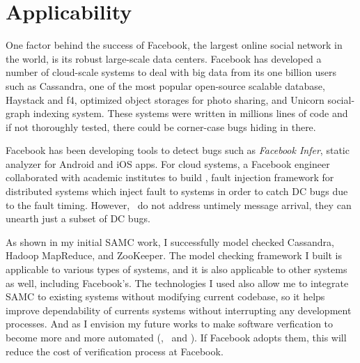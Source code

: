 \documentclass[11pt]{article}
\begin{document}
\section{Applicability}

One factor behind the success of Facebook, the largest online social network in
the world, is its robust large-scale data centers. Facebook has developed a
number of cloud-scale systems to deal with big data from its one billion users
such as Cassandra, one of the most popular open-source scalable database,
Haystack and f4, optimized object storages for photo sharing, and Unicorn
social-graph indexing system. These systems were written in millions lines of
code and if not thoroughly tested, there could be corner-case bugs hiding in
there.

Facebook has been developing tools to detect bugs such as \textit{Facebook
Infer}, static analyzer for Android and iOS apps. For cloud systems, a Facebook
engineer collaborated with academic institutes to build \fad, fault injection
framework for distributed systems which inject fault to systems in order to
catch DC bugs due to the fault timing. However, \fad\ do not address untimely
message arrival, they can unearth just a subset of DC bugs.


As shown in my initial SAMC work, I successfully model checked Cassandra, Hadoop
MapReduce, and ZooKeeper. The model checking framework I built is applicable to
various types of systems, and it is also applicable to other systems as well,
including Facebook's. The technologies I used also allow me to integrate SAMC to
existing systems without modifying current codebase, so it helps improve
dependability of currents systems without interrupting any development
processes. And as I envision my future works to make software verfication to
become more and more automated (\ie, \autocheck\ and \deepcheck). If Facebook
adopts them, this will reduce the cost of verification process at Facebook.



\end{document}

